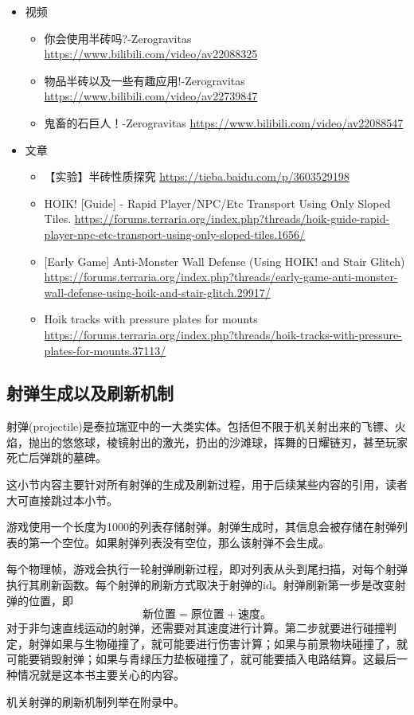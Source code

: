 \begin{itemize}
\item 视频
\begin{itemize}
\item 你会使用半砖吗?-Zerogravitas \url{https://www.bilibili.com/video/av22088325}
\item 物品半砖以及一些有趣应用!-Zerogravitas \url{https://www.bilibili.com/video/av22739847}
\item 鬼畜的石巨人！-Zerogravitas \url{https://www.bilibili.com/video/av22088547}
\end{itemize}
\item 文章
\begin{itemize}
\item 【实验】半砖性质探究 \url{https://tieba.baidu.com/p/3603529198}
\item HOIK! [Guide] - Rapid Player/NPC/Etc Transport Using Only Sloped Tiles. \url{https://forums.terraria.org/index.php?threads/hoik-guide-rapid-player-npc-etc-transport-using-only-sloped-tiles.1656/}
\item {[}Early Game] Anti-Monster Wall Defense (Using HOIK! and Stair Glitch) \url{https://forums.terraria.org/index.php?threads/early-game-anti-monster-wall-defense-using-hoik-and-stair-glitch.29917/}
\item Hoik tracks with pressure plates for mounts \url{https://forums.terraria.org/index.php?threads/hoik-tracks-with-pressure-plates-for-mounts.37113/}
\end{itemize}
\end{itemize}

\subsection{射弹生成以及刷新机制}
射弹(projectile)是泰拉瑞亚中的一大类实体。包括但不限于机关射出来的飞镖、火焰，抛出的悠悠球，棱镜射出的激光，扔出的沙滩球，挥舞的日耀链刃，甚至玩家死亡后弹跳的墓碑。

这小节内容主要针对所有射弹的生成及刷新过程，用于后续某些内容的引用，读者大可直接跳过本小节。

游戏使用一个长度为1000的列表存储射弹。射弹生成时，其信息会被存储在射弹列表的第一个空位。如果射弹列表没有空位，那么该射弹不会生成。

每个物理帧，游戏会执行一轮射弹刷新过程，即对列表从头到尾扫描，对每个射弹执行其刷新函数。每个射弹的刷新方式取决于射弹的id。射弹刷新第一步是改变射弹的位置，即$$\textrm{新位置}=\textrm{原位置}+\textrm{速度。}$$对于非匀速直线运动的射弹，还需要对其速度进行计算。第二步就要进行碰撞判定，射弹如果与生物碰撞了，就可能要进行伤害计算；如果与前景物块碰撞了，就可能要销毁射弹；如果与青绿压力垫板碰撞了，就可能要插入电路结算。这最后一种情况就是这本书主要关心的内容。

机关射弹的刷新机制列举在附录中。